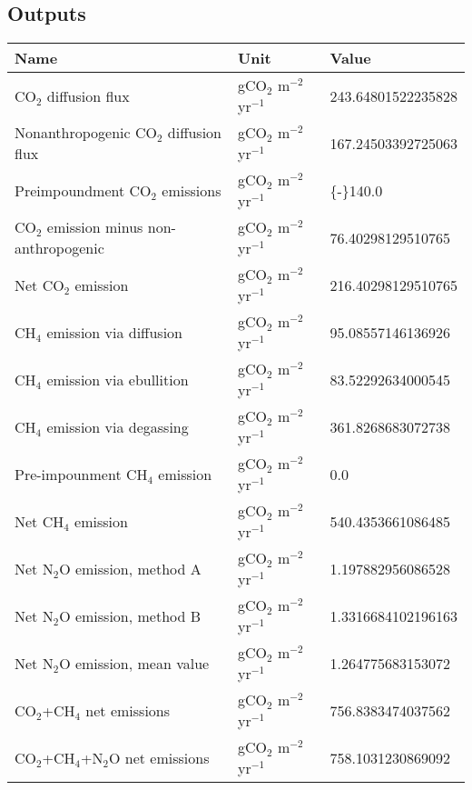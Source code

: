 \documentclass{article}%
\begin{document}
%
\subsection{Outputs}%
\label{subsec:Outputs}%
\begin{center}%
\renewcommand{\arraystretch}{1.0}%
\begin{tabu}{@{}p{10cm} X[c] X[l]@{}}%
\toprule%
\textbf{Name}&\textbf{Unit}&\textbf{Value}\\%
\midrule%
CO$_2$ diffusion flux&gCO$_2$ m$^{-2}$ yr$^{-1}$&\num[round-precision=4,round-mode=figures]{243.64801522235828}\\%
Nonanthropogenic CO$_2$ diffusion flux&gCO$_2$ m$^{-2}$ yr$^{-1}$&\num[round-precision=4,round-mode=figures]{167.24503392725063}\\%
Preimpoundment CO$_2$ emissions&gCO$_2$ m$^{-2}$ yr$^{-1}$&\num[round-precision=4,round-mode=figures]{{-}140.0}\\%
CO$_2$ emission minus non-anthropogenic&gCO$_2$ m$^{-2}$ yr$^{-1}$&\num[round-precision=4,round-mode=figures]{76.40298129510765}\\%
Net CO$_2$ emission&gCO$_2$ m$^{-2}$ yr$^{-1}$&\num[round-precision=4,round-mode=figures]{216.40298129510765}\\%
CH$_4$ emission via diffusion&gCO$_2$ m$^{-2}$ yr$^{-1}$&\num[round-precision=4,round-mode=figures]{95.08557146136926}\\%
CH$_4$ emission via ebullition&gCO$_2$ m$^{-2}$ yr$^{-1}$&\num[round-precision=4,round-mode=figures]{83.52292634000545}\\%
CH$_4$ emission via degassing&gCO$_2$ m$^{-2}$ yr$^{-1}$&\num[round-precision=4,round-mode=figures]{361.8268683072738}\\%
Pre-impounment CH$_4$ emission&gCO$_2$ m$^{-2}$ yr$^{-1}$&\num[round-precision=4,round-mode=figures]{0.0}\\%
Net CH$_4$ emission&gCO$_2$ m$^{-2}$ yr$^{-1}$&\num[round-precision=4,round-mode=figures]{540.4353661086485}\\%
Net N$_2$O emission, method A&gCO$_2$ m$^{-2}$ yr$^{-1}$&\num[round-precision=4,round-mode=figures]{1.197882956086528}\\%
Net N$_2$O emission, method B&gCO$_2$ m$^{-2}$ yr$^{-1}$&\num[round-precision=4,round-mode=figures]{1.3316684102196163}\\%
Net N$_2$O emission, mean value&gCO$_2$ m$^{-2}$ yr$^{-1}$&\num[round-precision=4,round-mode=figures]{1.264775683153072}\\%
\midrule%
CO$_2$+CH$_4$ net emissions&gCO$_2$ m$^{-2}$ yr$^{-1}$&\num[round-precision=4,round-mode=figures]{756.8383474037562}\\%
\midrule%
CO$_2$+CH$_4$+N$_2$O net emissions&gCO$_2$ m$^{-2}$ yr$^{-1}$&\num[round-precision=4,round-mode=figures]{758.1031230869092}\\\bottomrule%
%
\end{tabu}%
\end{center}%
\end{document}

